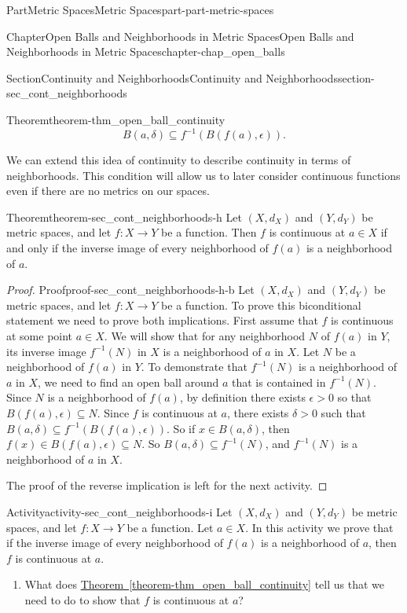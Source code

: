 \documentclass[oneside,10pt,]{book}
\newcommand{\xreffont}{\relax}
\numberwithin{equation}{chapter}
\newcommand{\gt}{>}
\begin{document}
\begin{partptx}{Part}{Metric Spaces}{}{Metric Spaces}{}{}{part-part-metric-spaces}
\begin{chapterptx}{Chapter}{Open Balls and Neighborhoods in Metric Spaces}{}{Open Balls and Neighborhoods in Metric Spaces}{}{}{chapter-chap_open_balls}
\begin{sectionptx}{Section}{Continuity and Neighborhoods}{}{Continuity and Neighborhoods}{}{}{section-sec_cont_neighborhoods}
\begin{theorem}{Theorem}{}{}{theorem-thm_open_ball_continuity}
\begin{equation*}
B(a, \delta) \subseteq f^{-1}\left(B(f(a), \epsilon)\right)\text{.}
\end{equation*}
%
\end{theorem}
We can extend this idea of continuity to describe continuity in terms of neighborhoods. This condition will allow us to later consider continuous functions even if there are no metrics on our spaces.%
\begin{theorem}{Theorem}{}{}{theorem-sec_cont_neighborhoods-h}%
Let \((X, d_X)\) and \((Y,d_Y)\) be metric spaces, and let \(f : X \to Y\) be a function. Then \(f\) is continuous at \(a \in X\) if and only if the inverse image of every neighborhood of \(f(a)\) is a neighborhood of \(a\).%
\end{theorem}
\begin{proof}{Proof}{}{proof-sec_cont_neighborhoods-h-b}
Let \((X, d_X)\) and \((Y,d_Y)\) be metric spaces, and let \(f : X \to Y\) be a function. To prove this biconditional statement we need to prove both implications. First assume that \(f\) is continuous at some point \(a \in X\). We will show that for any neighborhood \(N\) of \(f(a)\) in \(Y\), its inverse image \(f^{-1}(N)\) in \(X\) is a neighborhood of \(a\) in \(X\). Let \(N\) be a neighborhood of \(f(a)\) in \(Y\). To demonstrate that \(f^{-1}(N)\) is a neighborhood of \(a\) in \(X\), we need to find an open ball around \(a\) that is contained in \(f^{-1}(N)\). Since \(N\) is a neighborhood of \(f(a)\), by definition there exists \(\epsilon \gt 0\) so that \(B(f(a), \epsilon) \subseteq N\). Since \(f\) is continuous at \(a\), there exists \(\delta \gt 0\) such that \(B(a, \delta) \subseteq f^{-1}\left(B(f(a), \epsilon)\right)\). So if \(x \in B(a, \delta)\), then \(f(x) \in B(f(a), \epsilon) \subseteq N\). So \(B(a, \delta) \subseteq f^{-1}(N)\), and \(f^{-1}(N)\) is a neighborhood of \(a\) in \(X\).%
\par
The proof of the reverse implication is left for the next activity.%
\end{proof}
\begin{activity}{Activity}{}{activity-sec_cont_neighborhoods-i}%
Let \((X, d_X)\) and \((Y,d_Y)\) be metric spaces, and let \(f : X \to Y\) be a function. Let \(a \in X\). In this activity we prove that if the inverse image of every neighborhood of \(f(a)\) is a neighborhood of \(a\), then \(f\) is continuous at \(a\).%
\begin{enumerate}[font=\bfseries,label=(\alph*),ref=\alph*]%
\item{}What does \hyperref[theorem-thm_open_ball_continuity]{Theorem~{\xreffont\ref{theorem-thm_open_ball_continuity}}} tell us that we need to do to show that \(f\) is continuous at \(a\)?%

\end{enumerate}
\end{activity}
\end{sectionptx}
\end{chapterptx}
\end{partptx}
\end{document}
